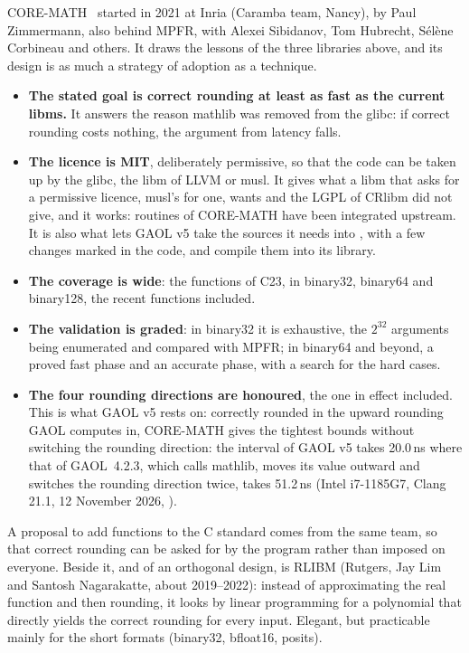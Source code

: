CORE-MATH~\cite{CoreMath:2022} started in 2021 at Inria (Caramba team,
Nancy), by Paul Zimmermann, also behind MPFR, with Alexei Sibidanov, Tom
Hubrecht, S\'el\`ene Corbineau and others. It draws the lessons of the
three libraries above, and its design is as much a strategy of adoption as
a technique.
\begin{itemize}
\item[$\bullet$] \textbf{The stated goal is correct rounding at least as
  fast as the current libms.} It answers the reason mathlib was removed
  from the glibc: if correct rounding costs nothing, the argument from
  latency falls.
\item[$\bullet$] \textbf{The licence is MIT}, deliberately permissive, so
  that the code can be taken up by the glibc, the libm of LLVM or musl. It
  gives what a libm that asks for a permissive licence, musl's for one, wants
  and the LGPL of CRlibm did not give, and it works: routines of
  CORE-MATH have been integrated upstream. It is also what lets GAOL v5
  take the sources it needs into , with a few changes marked
  in the code, and compile them into its library.
\item[$\bullet$] \textbf{The coverage is wide}: the functions of C23, in
  binary32, binary64 and binary128, the recent functions included.
\item[$\bullet$] \textbf{The validation is graded}: in binary32 it is
  exhaustive, the $2^{32}$ arguments being enumerated and compared with
  MPFR; in binary64 and beyond, a proved fast phase and an accurate phase,
  with a search for the hard cases.
\item[$\bullet$] \textbf{The four rounding directions are honoured}, the
  one in effect included. This is what GAOL v5 rests on: correctly rounded
  in the upward rounding GAOL computes in, CORE-MATH gives the tightest
  bounds without switching the rounding direction: the interval  of
  GAOL v5 takes 20.0\,ns where that of GAOL~4.2.3, which calls mathlib, moves its value outward and switches the rounding direction twice, takes 51.2\,ns (Intel i7-1185G7, Clang 21.1, 12 November 2026, ).
\end{itemize}
A proposal to add  functions to the C standard comes from the
same team, so that correct rounding can be asked for by the program rather
than imposed on everyone. Beside it, and of an orthogonal design, is RLIBM
(Rutgers, Jay Lim and Santosh Nagarakatte, about 2019--2022): instead of
approximating the real function and then rounding, it looks by linear
programming for a polynomial that directly yields the correct rounding for
every input. Elegant, but practicable mainly for the short formats
(binary32, bfloat16, posits).

